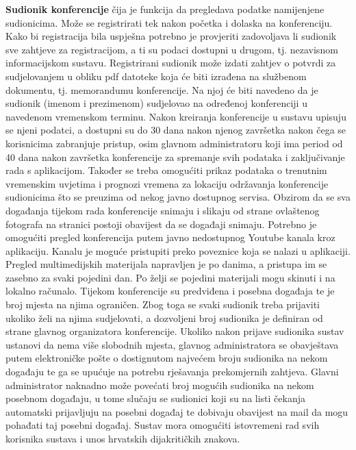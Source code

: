		\item\textbf{Sudionik konferencije} čija je funkcija da pregledava podatke namijenjene sudionicima. Može se registrirati tek nakon početka i dolaska na konferenciju. Kako bi registracija bila uspješna potrebno je provjeriti zadovoljava li sudionik sve zahtjeve za registracijom, a ti su podaci dostupni u drugom, tj. nezavisnom informacijskom sustavu. Registrirani sudionik može izdati zahtjev o potvrdi za sudjelovanjem u obliku pdf datoteke koja će biti izrađena na službenom dokumentu, tj. memorandumu konferencije. Na njoj će biti navedeno da je sudionik (imenom i prezimenom) sudjelovao na određenoj konferenciji u navedenom vremenskom terminu.
		\newline
		\newline
		Nakon kreiranja konferencije u sustavu upisuju se njeni podatci, a dostupni su do 30 dana nakon njenog završetka nakon čega se korisnicima zabranjuje pristup, osim glavnom administratoru koji ima period od 40 dana nakon završetka konferencije za spremanje svih podataka i zaključivanje rada s aplikacijom. Također se treba omogućiti prikaz podataka o trenutnim vremenskim uvjetima i prognozi vremena za lokaciju održavanja konferencije sudionicima što se preuzima od nekog javno dostupnog servisa. Obzirom da se sva događanja tijekom rada konferencije snimaju i slikaju od strane ovlaštenog fotografa na stranici postoji obavijest da se događaji snimaju. Potrebno je omogućiti pregled konferencija putem javno nedostupnog Youtube kanala kroz aplikaciju. Kanalu je moguće pristupiti preko poveznice koja se nalazi u aplikaciji. Pregled multimedijskih materijala napravljen je po danima, a pristupa im se zasebno za svaki pojedini dan. Po želji se pojedini materijali mogu skinuti i na lokalno računalo.
		\newline
		Tijekom konferencije su predviđena i posebna događaja te je broj mjesta na njima ograničen. Zbog toga se svaki sudionik treba prijaviti ukoliko želi na njima sudjelovati, a dozvoljeni broj sudionika je definiran od strane glavnog organizatora konferencije. Ukoliko nakon prijave sudionika sustav ustanovi da nema više slobodnih mjesta, glavnog administratora se obavještava putem elektroničke pošte o dostignutom najvećem broju sudionika na nekom događaju te ga se upućuje na potrebu rješavanja prekomjernih zahtjeva. Glavni administrator naknadno može povećati broj mogućih sudionika na nekom posebnom događaju, u tome slučaju se sudionici koji su na listi čekanja automatski prijavljuju na posebni događaj te dobivaju obavijest na mail da mogu pohađati taj posebni događaj.
		\newline
	    Sustav mora omogućiti istovremeni rad svih korisnika sustava i   
	    unos hrvatskih dijakritičkih znakova.
